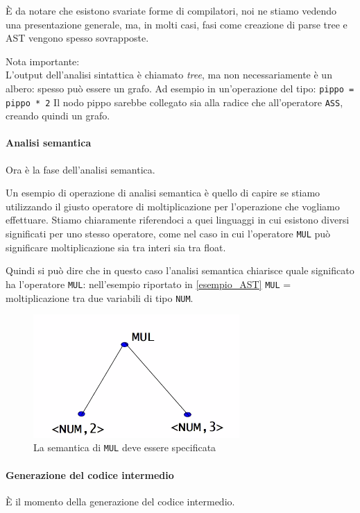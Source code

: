 \documentclass[class=book, crop=false, oneside, 12pt]{standalone}
\begin{document}
È da notare che esistono svariate forme di compilatori, noi ne stiamo vedendo una presentazione generale, ma, in molti casi, fasi come creazione di parse tree e AST vengono spesso sovrapposte.

Nota importante:\\
L’output dell’analisi sintattica è chiamato \emph{tree}, ma non necessariamente è un albero: spesso può essere un grafo. Ad esempio in un’operazione del tipo:
\texttt{pippo = pippo * 2}
Il nodo pippo sarebbe collegato sia alla radice che all’operatore \texttt{ASS}, creando quindi un grafo.

\paragraph{Analisi semantica}
Ora è la fase dell’analisi semantica.

Un esempio di operazione di analisi semantica è quello di capire se stiamo utilizzando il giusto operatore di moltiplicazione per l’operazione che vogliamo effettuare. Stiamo chiaramente riferendoci a quei linguaggi in cui esistono diversi significati per uno stesso operatore, come nel caso in cui l'operatore \texttt{MUL} può significare moltiplicazione sia tra interi sia tra float.

Quindi si può dire che in questo caso l’analisi semantica chiarisce quale significato ha l’operatore \texttt{MUL}: nell’esempio riportato in \ref{esempio_AST} \texttt{MUL} = moltiplicazione tra due variabili di tipo \texttt{NUM}.
\begin{figure}[H]
	\centering
	\includegraphics[width=0.7\textwidth,keepaspectratio]{semantic_analysis}
	\caption{La semantica di \texttt{MUL} deve essere specificata}
\end{figure}

\paragraph{Generazione del codice intermedio}
È il momento della generazione del codice intermedio.
\end{document}
